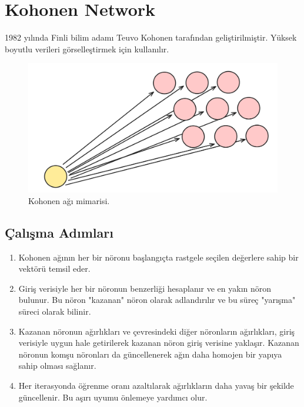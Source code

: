 \section{Kohonen Network}
1982 yılında Finli bilim adamı Teuvo Kohonen tarafından geliştirilmiştir. Yüksek boyutlu verileri görselleştirmek için kullanılır. 

\begin{figure}[h]
    \centering
    \includegraphics[width=1\textwidth]{images/kohonen_network.png}
    \caption{Kohonen ağı mimarisi.}
    \label{fig:enter-label}
\end{figure}

\subsection{Çalışma Adımları}
\begin{enumerate}
    \item Kohonen ağının her bir nöronu başlangıçta rastgele seçilen değerlere sahip bir vektörü temsil eder.
    \item Giriş verisiyle her bir nöronun benzerliği hesaplanır ve en yakın nöron bulunur. Bu nöron "kazanan" nöron olarak adlandırılır ve bu süreç "yarışma" süreci olarak bilinir.
    \item Kazanan nöronun ağırlıkları ve çevresindeki diğer nöronların ağırlıkları, giriş verisiyle uygun hale getirilerek kazanan nöron giriş verisine yaklaşır. Kazanan nöronun komşu nöronları da güncellenerek ağın daha homojen bir yapıya sahip olması sağlanır.
    \item Her iterasyonda öğrenme oranı azaltılarak ağırlıkların daha yavaş bir şekilde güncellenir. Bu aşırı uyumu önlemeye yardımcı olur.
\end{enumerate}

\newpage